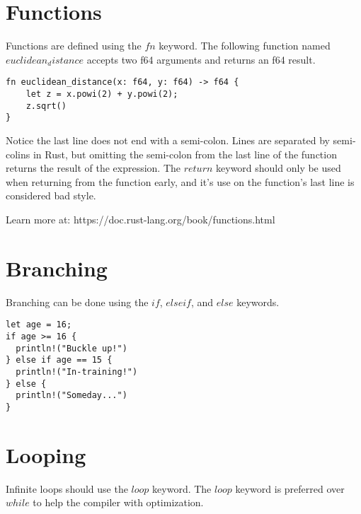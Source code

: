 \documentclass[a0,final]{a0poster}
\begin{document}
\begin{multicols}{3}
\section*{Functions}

Functions are defined using the $fn$ keyword. The following function named $euclidean_distance$ accepts two f64 arguments and returns an f64 result.

\begin{verbatim}
fn euclidean_distance(x: f64, y: f64) -> f64 {
    let z = x.powi(2) + y.powi(2);
    z.sqrt()
}
\end{verbatim}

Notice the last line does not end with a semi-colon. Lines are separated by semi-colins in Rust, but omitting the semi-colon from the last line of the function returns the result of the expression. The $return$ keyword should only be used when returning from the function early, and it's use on the function's last line is considered bad style.

Learn more at: https://doc.rust-lang.org/book/functions.html










\columnbreak

\section*{Branching}

Branching can be done using the $if$, $else if$, and $else$ keywords.

\begin{verbatim}
let age = 16;
if age >= 16 {
  println!("Buckle up!")
} else if age == 15 {
  println!("In-training!")
} else {
  println!("Someday...")
}
\end{verbatim}

\section*{Looping}

Infinite loops should use the $loop$ keyword. The $loop$ keyword is preferred over $while$ to help the compiler with optimization.


\end{multicols}
\end{document}
